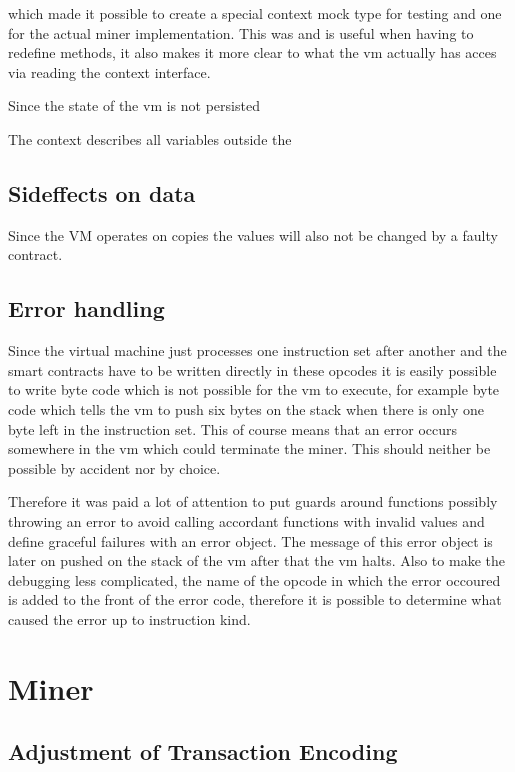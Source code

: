 which made it possible to create a special context mock type for testing and one for the actual miner implementation. This was and is useful when having to redefine methods, it also makes it more clear to what the vm actually has acces via reading the context interface. 


Since the state of the vm is not persisted 

The context describes all variables outside the 

\subsection{Sideffects on data}

Since the VM operates on copies the values will also not be changed by a faulty contract.

\subsection{Error handling}
Since the virtual machine just processes one instruction set after another and the smart contracts have to be written directly in these opcodes it is easily possible to write byte code which is not possible for the vm to execute, for example byte code which tells the vm to push six bytes on the stack when there is only one byte left in the instruction set. This of course means that an error occurs somewhere in the vm which could terminate the miner. This should neither be possible by accident nor by choice.

Therefore it was paid a lot of attention to put guards around functions possibly throwing an error to avoid calling accordant functions with invalid values and define graceful failures with an error object. The message of this error object is later on pushed on the stack of the vm after that the vm halts. Also to make the debugging less complicated, the name of the opcode in which the error occoured is added to the front of the error code, therefore it is possible to determine what caused the error up to instruction kind.

\section{Miner}

\subsection{Adjustment of Transaction Encoding}

